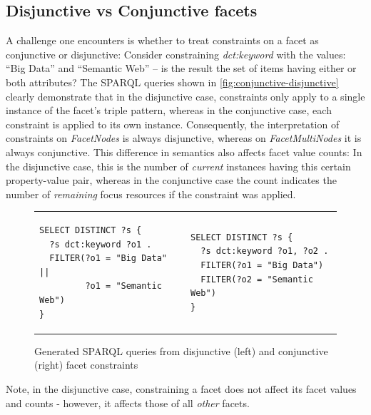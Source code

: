 \subsection{Disjunctive vs Conjunctive facets}
A challenge one encounters is whether to treat constraints on a facet as conjunctive or disjunctive: Consider constraining \emph{dct:keyword} with the values: ``Big Data'' and ``Semantic Web'' -- is the result the set of items having either or both attributes?
The SPARQL queries shown in \autoref{fig:conjunctive-disjunctive} clearly demonstrate that in the disjunctive case, constraints only apply to a single instance of the facet's triple pattern, whereas in the conjunctive case, each constraint is applied to its own instance. Consequently, the interpretation of constraints on \emph{FacetNodes} is always disjunctive, whereas on \emph{FacetMultiNodes} it is always conjunctive. This difference in semantics also affects facet value counts: In the disjunctive case, this is the number of \emph{current} instances having this certain property-value pair, whereas in the conjunctive case the count indicates the number of \emph{remaining} focus resources if the constraint was applied.




\begin{figure}
\centering
\bgroup
\def\arraystretch{1.5}
\begin{tabular}{m{6cm}m{10cm}}
\begin{lstlisting}[language=sparql, linewidth=5cm]
SELECT DISTINCT ?s {
  ?s dct:keyword ?o1 .
  FILTER(?o1 = "Big Data" ||
         ?o1 = "Semantic Web")
}
\end{lstlisting}

&
\begin{lstlisting}[language=sparql, linewidth=5cm]
SELECT DISTINCT ?s {
  ?s dct:keyword ?o1, ?o2 .
  FILTER(?o1 = "Big Data")
  FILTER(?o2 = "Semantic Web")
}
\end{lstlisting}

\end{tabular}
\egroup
\caption{Generated SPARQL queries from disjunctive (left) and conjunctive (right) facet constraints}
\label{fig:conjunctive-disjunctive}
\end{figure}


Note, in the disjunctive case, constraining a facet does not affect its facet values and counts - however, it affects those of all \emph{other} facets.

